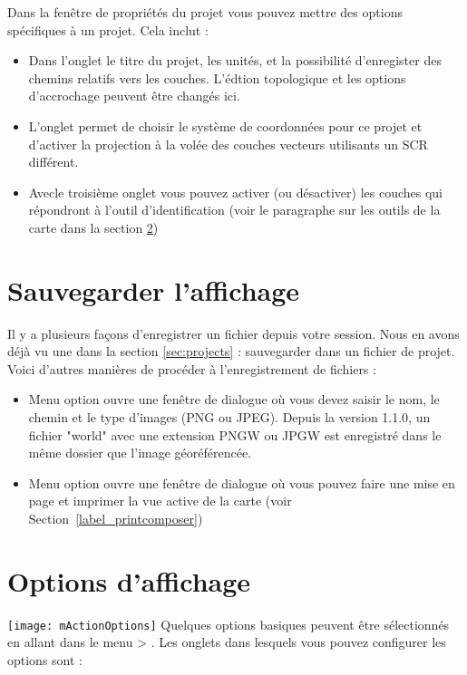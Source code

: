 Dans la fenêtre de propriétés du projet vous pouvez mettre des options spécifiques à un projet. Cela inclut :
\begin{itemize}[label=--]
 \item Dans l'onglet  le titre du projet, les unités, et la possibilité d'enregister des chemins relatifs vers les couches. L'édtion topologique et les options d'accrochage peuvent être changés ici.
\item L'onglet  permet de choisir le système de coordonnées pour ce projet et d'activer la projection à la volée des couches vecteurs utilisants un SCR différent.
\item Avecle troisième onglet  vous pouvez activer (ou désactiver) les couches qui répondront à l'outil d'identification (voir le paragraphe sur les outils de la carte dans la section \ref{subsec:gui_options})
\end{itemize}

\section{Sauvegarder l'affichage}\label{sec:output}
Il y a plusieurs façons d'enregistrer un fichier depuis votre session. Nous en avons déjà vu une dans la section \ref{sec:projects} : sauvegarder dans un fichier de projet.
Voici d'autres manières de procéder à l'enregistrement de fichiers :
\begin{itemize}[label=--]
\item Menu option  ouvre une fenêtre de dialogue où vous devez saisir le nom, le chemin et le type d'images (PNG ou JPEG). Depuis la version 1.1.0, un fichier "world" avec une extension PNGW ou JPGW est enregistré dans le même dossier que l'image géoréférencée.
\item Menu option  ouvre une fenêtre de dialogue où vous pouvez faire une mise en page et imprimer la vue active de la carte (voir Section~\ref{label_printcomposer})
\end{itemize}

\section{Options d'affichage}\label{subsec:gui_options}
\texttt{[image: mActionOptions]} 
Quelques options basiques peuvent être sélectionnés en allant dans le menu  >
. Les onglets dans lesquels vous pouvez configurer les options sont :

